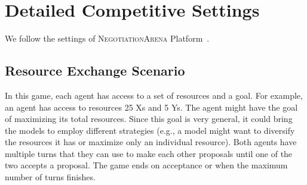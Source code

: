 




\section{Detailed Competitive Settings}
We follow the settings of {\color{mediumpurple}\textsc{NegotiationArena}} Platform~\citep{bianchi2024well}. 
\subsection{Resource Exchange Scenario}
In this game, each agent has access to a set of resources and a goal. For example, an agent has access to resources 25 Xs and 5 Ys. The agent might have the goal of maximizing its total resources. Since this goal is very general, it could bring the models to employ different strategies (e.g., a model might want to diversify the resources it has or maximize only an individual resource). Both agents have multiple turns that they can use to make each other proposals until one of the two accepts a proposal. The game ends on acceptance or when the maximum number of turns finishes.

